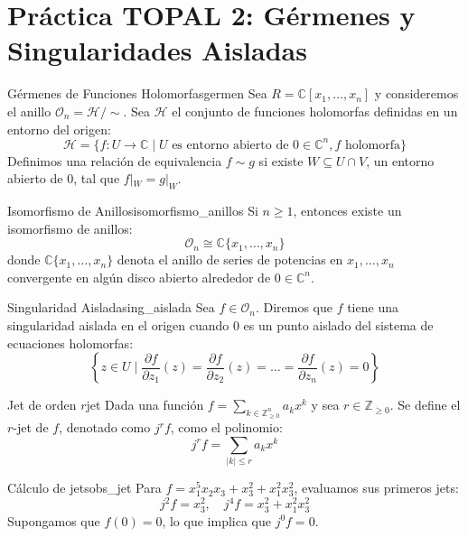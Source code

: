 \documentclass[11pt,a4paper]{article}
\begin{document}
\section{Práctica TOPAL 2: Gérmenes y Singularidades Aisladas}
\label{sec:p2}

\begin{definicion}{Gérmenes de Funciones Holomorfas}{germen}
Sea $R = \mathbb{C}[x_1, \dots, x_n]$ y consideremos el anillo $\mathcal{O}_n = \mathcal{H}/\sim$. Sea $\mathcal{H}$ el conjunto de funciones holomorfas definidas en un entorno del origen:
$$ \mathcal{H} = \{ f: U \to \mathbb{C} \mid U \text{ es entorno abierto de } 0 \in \mathbb{C}^n, f \text{ holomorfa} \} $$
Definimos una relación de equivalencia $f \sim g$ si existe $W \subseteq U \cap V$, un entorno abierto de $0$, tal que $f|_W = g|_W$.
\end{definicion}

\begin{teorema}{Isomorfismo de Anillos}{isomorfismo_anillos}
Si $n \ge 1$, entonces existe un isomorfismo de anillos:
$$ \mathcal{O}_n \cong \mathbb{C}\{x_1, \dots, x_n\} $$
donde $\mathbb{C}\{x_1, \dots, x_n\}$ denota el anillo de series de potencias en $x_1, \dots, x_n$ convergente en algún disco abierto alrededor de $0 \in \mathbb{C}^n$.
\end{teorema}

\begin{definicion}{Singularidad Aislada}{sing_aislada}
Sea $f \in \mathcal{O}_n$. Diremos que $f$ tiene una singularidad aislada en el origen cuando $0$ es un punto aislado del sistema de ecuaciones holomorfas:
$$ \left\{ z \in U \mid \frac{\partial f}{\partial z_1}(z) = \frac{\partial f}{\partial z_2}(z) = \dots = \frac{\partial f}{\partial z_n}(z) = 0 \right\} $$
\end{definicion}

\begin{definicion}{Jet de orden $r$}{jet}
Dada una función $f = \sum_{k \in \mathbb{Z}_{\ge 0}^n} a_k x^k$ y sea $r \in \mathbb{Z}_{\ge 0}$. Se define el $r$-jet de $f$, denotado como $j^r f$, como el polinomio:
$$ j^r f = \sum_{|k| \le r} a_k x^k $$
\end{definicion}

\begin{observacion}{Cálculo de jets}{obs_jet}
Para $f = x_1^5 x_2 x_3 + x_3^2 + x_1^2 x_3^2$, evaluamos sus primeros jets:
$$ j^2 f = x_3^2, \quad j^4 f = x_3^2 + x_1^2 x_3^2 $$
Supongamos que $f(0)=0$, lo que implica que $j^0 f = 0$.
\end{observacion}
\end{document}
